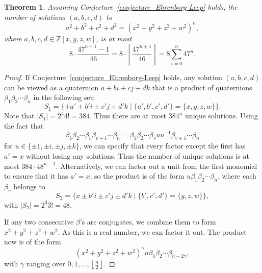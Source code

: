 \documentclass[12pt]{article}
\newtheorem{theorem}{Theorem}[section]
\theoremstyle{definition}
\theoremstyle{remark}
\newcommand{\Zzz}{\mathbb Z}
\numberwithin{equation}{section}
\begin{document}
\begin{theorem}
Assuming Conjecture~\ref{conjecture_Ehrenborg-Leep} holds,
the number of solutions \( (a, b, c, d) \) to
\[
a^2 + b^2 + c^2 + d^2 = (x^2 + y^2 + z^2 + w^2)^n,
\] 
where \( a, b, c, d \in \Zzz[x,y,z,w]\),
is at most
\[
8 \cdot \frac{47^{n+1} - 1}{46}
=  8 \cdot \left\lfloor \frac{ 47^{n+1} }{46} \right\rfloor
=  8 \sum_{i = 0}^n{47^n}.
\]
\end{theorem}
\begin{proof}
If Conjecture~\ref{conjecture_Ehrenborg-Leep} holds, any
solution
\( (a, b, c, d) \) can be viewed as a quaternion
\( a + bi + cj + dk \) that is a product of
quaternions \( \beta_1 \beta_2 \cdots \beta_n \) in the following set:
\[
S_1 = \{ \pm a' \pm b'i \pm c'j \pm d'k
\mid \{ a', b', c', d' \} = \{ x, y, z, w \} \}. 
\]
Note that \( | S_1 | = 2^4 4! = 384 \).
Thus there are at most \( 384^n \) unique solutions.
Using the fact that
\[
\beta_1 \beta_2 \cdots \beta_v \beta_{v+1} \cdots \beta_n
=
\beta_1 \beta_2 \cdots \beta_v u u^{-1} \beta_{v+1} \cdots \beta_n
\]
for \( u \in \{ \pm 1 , \pm i, \pm j, \pm k \} \), we can specify
that every factor except the first has \( a' = x \) without
losing any solutions. Thus the number of unique solutions is at most
\( 384 \cdot 48^{n-1} \). Alternatively, we can factor out a unit
from the first monomial to ensure that it has \( a' = x \), so the
product is of the form \( u \beta_1 \beta_2 \cdots \beta_n \),
where each \( \beta_v \) belongs to
\[
S_2 = \{ x \pm b'i \pm c'j \pm d'k
\mid \{ b', c', d' \} = \{ y, z, w \} \},
\]
with \( | S_2 | = 2^3 3! = 48 \).

If any two consecutive \( \beta \)'s are conjugates, we combine them
to form \( x^2 + y^2 + z^2 + w^2 \). As this is a real number, we can
factor it out. The product now is of the form
\[
(x^2 + y^2 + z^2 + w^2)^\gamma u \beta_1 \beta_2 \cdots \beta_{n-2\gamma},
\]
with \( \gamma \) ranging over \( 0, 1, \ldots, \left\lfloor \frac{n}{2} \right\rfloor \).


\end{proof}
\end{document}
